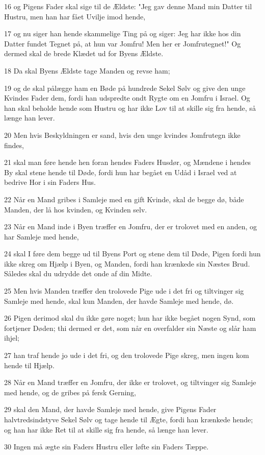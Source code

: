 \par 16 og Pigens Fader skal sige til de Ældste: "Jeg gav denne Mand min Datter til Hustru, men han har fået Uvilje imod hende,
\par 17 og nu siger han hende skammelige Ting på og siger: Jeg har ikke hos din Datter fundet Tegnet på, at hun var Jomfru! Men her er Jomfrutegnet!" Og dermed skal de brede Klædet ud for Byens Ældste.
\par 18 Da skal Byens Ældste tage Manden og revse ham;
\par 19 og de skal pålægge ham en Bøde på hundrede Sekel Sølv og give den unge Kvindes Fader dem, fordi han udspredte ondt Rygte om en Jomfru i Israel. Og han skal beholde hende som Hustru og har ikke Lov til at skille sig fra hende, så længe han lever.
\par 20 Men hvis Beskyldningen er sand, hvis den unge kvindes Jomfrutegn ikke findes,
\par 21 skal man føre hende hen foran hendes Faders Husdør, og Mændene i hendes By skal stene hende til Døde, fordi hun har begået en Udåd i Israel ved at bedrive Hor i sin Faders Hus.
\par 22 Når en Mand gribes i Samleje med en gift Kvinde, skal de begge dø, både Manden, der lå hos kvinden, og Kvinden selv.
\par 23 Når en Mand inde i Byen træffer en Jomfru, der er trolovet med en anden, og har Samleje med hende,
\par 24 skal I føre dem begge ud til Byens Port og stene dem til Døde, Pigen fordi hun ikke skreg om Hjælp i Byen, og Manden, fordi han krænkede sin Næstes Brud. Således skal du udrydde det onde af din Midte.
\par 25 Men hvis Manden træffer den trolovede Pige ude i det fri og tiltvinger sig Samleje med hende, skal kun Manden, der havde Samleje med hende, dø.
\par 26 Pigen derimod skal du ikke gøre noget; hun har ikke begået nogen Synd, som fortjener Døden; thi dermed er det, som når en overfalder sin Næste og slår ham ihjel;
\par 27 han traf hende jo ude i det fri, og den trolovede Pige skreg, men ingen kom hende til Hjælp.
\par 28 Når en Mand træffer en Jomfru, der ikke er trolovet, og tiltvinger sig Samleje med hende, og de gribes på fersk Gerning,
\par 29 skal den Mand, der havde Samleje med hende, give Pigens Fader halvtredsindstyve Sekel Sølv og tage hende til Ægte, fordi han krænkede hende; og han har ikke Ret til at skille sig fra hende, så længe han lever.
\par 30 Ingen må ægte sin Faders Hustru eller løfte sin Faders Tæppe.

